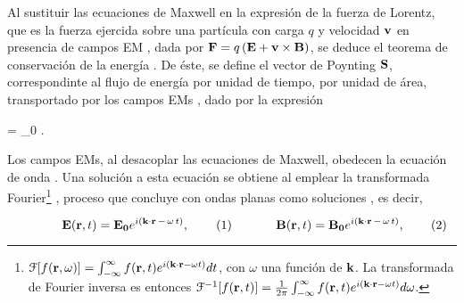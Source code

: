 
Al sustituir las ecuaciones de Maxwell en la expresión de la fuerza de Lorentz, que es la fuerza ejercida sobre una partícula con carga $q$ y velocidad $\vb{v}$ en presencia de campos EM \cite{griffiths2013electrodynamics}, dada por $	\vb{F} = q \left( \vb{E} + \vb{v}\times \vb{B} \right)$, se deduce el teorema de  conservación de la energía \cite{griffiths2013electrodynamics}. De éste, se define el vector de Poynting $\vb{S}$, correspondinte al flujo de energía por unidad de tiempo, por unidad de área, transportado por los campos EMs \cite{griffiths2013electrodynamics}, dado por la expresión  
	\begin{tcolorbox}[title = Vector de Poynting, ams align]
	 = _0 \times{}.  \label{eq:Poynting}
	\end{tcolorbox}

Los campos EMs, al desacoplar las ecuaciones de Maxwell, obedecen la ecuación de onda \cite{algo}. Una solución a esta ecuación se obtiene al emplear la transformada Fourier\footnote{  $\mathcal{F}[f(\vb{r},\omega)] = \int_{-\infty}^\infty f(\vb{r},t) e^{i(\vb{k}\cdot\vb{r} -\omega t)} dt$, con $\omega$ una función de $\vb{k}$. La transformada de Fourier inversa es entonces $\mathcal{F}^{-1}[f(\vb{r},t)] =\frac{1}{2\pi} \int_{-\infty}^\infty f(\vb{r},t) e^{i(\vb{k}\cdot\vb{r} -\omega t)} d\omega$.} \cite{jackson1999electrodynamics}, proceso que concluye con ondas planas como soluciones , es decir, 
	\begin{subequations}
	
	\eqhalf{	\vb{E}(\vb{r},t) =\vb{E_0}e^{i(\vb{k}\cdot\vb{r} \,-\,\omega \,t)},\label{seq:OplanaE} }
	\eqhalf{	\vb{B}(\vb{r}, t) =\vb{B_0}e^{i(\vb{k}\cdot\vb{r} \,-\,\omega\, t)}, \label{seq:OplanaB}}
	\label{eqs:OPlana}\end{subequations} 
	
